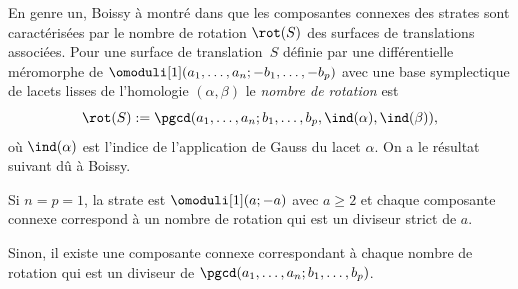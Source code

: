 En genre un, Boissy à montré dans \cite[\S4.2]{Bo} que les composantes connexes des strates sont caractérisées par le nombre de rotation $\rot(S)$ des surfaces de translations associées. Pour une surface de translation~$S$ définie par une différentielle méromorphe de $\omoduli[1](a_{1},\dots,a_{n};-b_{1},\dots,-b_{p})$ avec une base symplectique de lacets lisses de l'homologie $(\alpha,\beta)$ le \emph{nombre de rotation} est \[
\rot(S):=\pgcd(a_{1},\dots,a_{n};b_{1},\dots,b_{p},\ind(\alpha),\ind(\beta)),\] où $\ind(\alpha)$ est l'indice de l’application de Gauss du lacet $\alpha$. On a le résultat suivant dû à Boissy.
\begin{enumeratei}
\item
Si $n=p=1$, la strate est $\omoduli[1](a;-a)$ avec $a\geq2$ et chaque composante connexe correspond à un nombre de rotation qui est un diviseur strict de $a$.
\item
Sinon, il existe une composante connexe correspondant à chaque nombre de rotation qui est un diviseur de $\pgcd(a_{1},\dots,a_{n};b_{1},\dots,b_{p})$.
\end{enumeratei}

